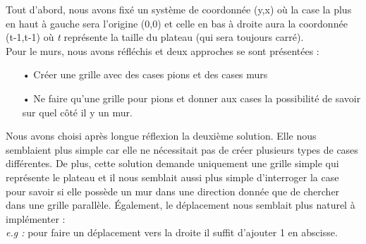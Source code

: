 \documentclass[a4paper, 12pt]{article}
\begin{document}
Tout d'abord, nous avons fixé un système de coordonnée (y,x) où la case la plus en haut à gauche sera l'origine (0,0) et celle en bas à droite aura la coordonnée (t-1,t-1) où \textit{t} représente la taille du plateau (qui sera toujours carré). \\

Pour le murs, nous avons réfléchis et deux approches se sont présentées : 
\begin{itemize}
\item[•] Créer une grille avec des cases pions et des cases murs
\item[•] Ne faire qu'une grille pour pions et donner aux cases la possibilité de savoir sur quel côté il y un mur.
\end{itemize}
Nous avons choisi après longue réflexion la deuxième solution. Elle nous semblaient plus simple car elle ne nécessitait pas de créer plusieurs types de cases différentes. De plus, cette solution demande uniquement une grille simple qui représente le plateau et il nous semblait aussi plus simple d'interroger la case pour savoir si elle possède un mur dans une direction donnée que de chercher dans une grille parallèle. Également, le déplacement nous semblait plus naturel à implémenter : \\
\textit{e.g :} pour faire un déplacement vers la droite il suffit d'ajouter 1 en abscisse. \\
\end{document}
